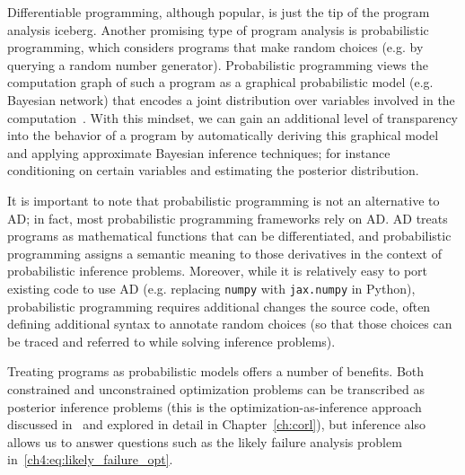 Differentiable programming, although popular, is just the tip of the program analysis iceberg. Another promising type of program analysis is probabilistic programming, which considers programs that make random choices (e.g. by querying a random number generator). Probabilistic programming views the computation graph of such a program as a graphical probabilistic model (e.g. Bayesian network) that encodes a joint distribution over variables involved in the computation~\cite{woodNewApproachProbabilistic2014}. With this mindset, we can gain an additional level of transparency into the behavior of a program by automatically deriving this graphical model and applying approximate Bayesian inference techniques; for instance conditioning on certain variables and estimating the posterior distribution.

It is important to note that probabilistic programming is not an alternative to AD; in fact, most probabilistic programming frameworks rely on AD. AD treats programs as mathematical functions that can be differentiated, and probabilistic programming assigns a semantic meaning to those derivatives in the context of probabilistic inference problems. Moreover, while it is relatively easy to port existing code to use AD (e.g. replacing \texttt{numpy} with \texttt{jax.numpy} in Python), probabilistic programming requires additional changes the source code, often defining additional syntax to annotate random choices (so that those choices can be traced and referred to while solving inference problems).

Treating programs as probabilistic models offers a number of benefits. Both constrained and unconstrained optimization problems can be transcribed as posterior inference problems (this is the optimization-as-inference approach discussed in~\cite{maSamplingCanBe2019,levineReinforcementLearningControl2018a} and explored in detail in Chapter~\ref{ch:corl}), but inference also allows us to answer questions such as the likely failure analysis problem in~\eqref{ch4:eq:likely_failure_opt}.

